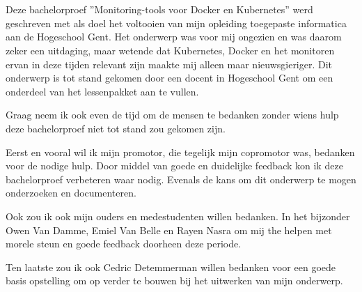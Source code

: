 \chapter*{}
\label{ch:voorwoord}

Deze bachelorproef ''Monitoring-tools voor Docker en Kubernetes'' werd geschreven met als doel het voltooien van mijn opleiding toegepaste informatica aan de Hogeschool Gent. Het onderwerp was voor mij ongezien en was daarom zeker een uitdaging, maar wetende dat Kubernetes, Docker en het monitoren ervan in deze tijden relevant zijn maakte mij alleen maar nieuwsgieriger. Dit onderwerp is tot stand gekomen door een docent in Hogeschool Gent om een onderdeel van het lessenpakket aan te vullen.

Graag neem ik ook even de tijd om de mensen te bedanken zonder wiens hulp deze bachelorproef niet tot stand zou gekomen zijn.

Eerst en vooral wil ik mijn promotor, die tegelijk mijn copromotor was, bedanken voor de nodige hulp. Door middel van goede en duidelijke feedback kon ik deze bachelorproef verbeteren waar nodig. Evenals de kans om dit onderwerp te mogen onderzoeken en documenteren.

Ook zou ik ook mijn ouders en medestudenten willen bedanken. In het bijzonder
Owen Van Damme, Emiel Van Belle en Rayen Nasra om mij the helpen met
morele steun en goede feedback doorheen deze periode.

Ten laatste zou ik ook Cedric Detemmerman willen bedanken voor een goede basis opstelling om op verder te bouwen bij het uitwerken van mijn onderwerp.
